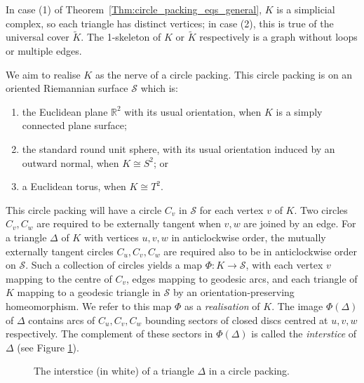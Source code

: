 \documentclass[12pt]{amsart}
\numberwithin{equation}{section}
\theoremstyle{named}
\newcommand{\refthm}[1]{Theorem~\ref{Thm:#1}}
\newcommand{\R}{\mathbb{R}}
\newcommand{\To}{\longrightarrow}
\begin{document}
In case (1) of \refthm{circle_packing_eqs_general}, $K$ is a simplicial complex, so each triangle has distinct vertices; in case (2), this is true of the universal cover $\widetilde{K}$. 
The 1-skeleton of $K$ or $\widetilde{K}$ respectively is a graph without loops or multiple edges. 

 We aim to realise $K$ as the nerve of a circle packing. This circle packing is on an oriented Riemannian surface $\mathcal{S}$ which is: 
\begin{enumerate}
\item[(a)] the Euclidean plane $\R^2$ with its usual orientation, when $K$ is a simply connected plane surface; 
\item[(b)] the standard round unit sphere, with its usual orientation induced by an outward normal, when $K \cong S^2$; or 
\item[(c)] a Euclidean torus, when $K \cong T^2$.
\end{enumerate}
This circle packing will have a circle $C_v$ in $\mathcal{S}$ for each vertex $v$ of $K$. Two circles $C_v, C_w$ are required to be externally tangent when $v,w$ are joined by an edge. For a triangle $\Delta$ of $K$ with vertices $u,v,w$ in anticlockwise order, the mutually externally tangent circles $C_u, C_v, C_w$ are required also to be in anticlockwise order on $\mathcal{S}$. Such a collection of circles yields a map $\Phi \colon K \To \mathcal{S}$, with each vertex $v$ mapping to the centre of $C_v$, edges mapping to geodesic arcs, and each triangle of $K$ mapping to a geodesic triangle in $\mathcal{S}$ by an orientation-preserving homeomorphism. We refer to this map $\Phi$ as a \emph{realisation} of $K$. 
 The image $\Phi(\Delta)$ of $\Delta$ contains arcs of $C_u, C_v, C_w$ bounding sectors of closed discs centred at $u,v,w$ respectively. The complement of these sectors in $\Phi(\Delta)$ is called the \emph{interstice} of $\Delta$ (see Figure \ref{fig:Interstice}).
\begin{figure}[!h]
 \centering
{} 
\caption{The interstice (in white) of a triangle $\Delta$ in a circle packing.}
 \label{fig:Interstice}
\end{figure}
\end{document}

